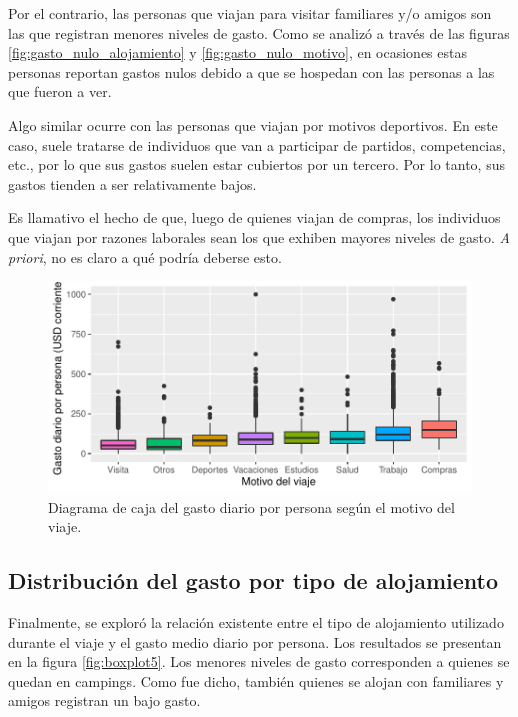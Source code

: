 \documentclass[
]{article}
\begin{document}
Por el contrario, las personas que viajan para visitar familiares y/o
amigos son las que registran menores niveles de gasto. Como se analizó a
través de las figuras \ref{fig:gasto_nulo_alojamiento} y
\ref{fig:gasto_nulo_motivo}, en ocasiones estas personas reportan gastos
nulos debido a que se hospedan con las personas a las que fueron a ver.

Algo similar ocurre con las personas que viajan por motivos deportivos.
En este caso, suele tratarse de individuos que van a participar de
partidos, competencias, etc., por lo que sus gastos suelen estar
cubiertos por un tercero. Por lo tanto, sus gastos tienden a ser
relativamente bajos.

Es llamativo el hecho de que, luego de quienes viajan de compras, los
individuos que viajan por razones laborales sean los que exhiben mayores
niveles de gasto. \emph{A priori}, no es claro a qué podría deberse
esto.

\begin{figure}[H]

{\centering \includegraphics{Informe-Proyectofinal_files/figure-latex/boxplot4-1} 

}

\caption{Diagrama de caja del gasto diario por persona según el motivo del viaje.}\label{fig:boxplot4}
\end{figure}

\hypertarget{distribuciuxf3n-del-gasto-por-tipo-de-alojamiento}{%
\subsection{Distribución del gasto por tipo de
alojamiento}\label{distribuciuxf3n-del-gasto-por-tipo-de-alojamiento}}

Finalmente, se exploró la relación existente entre el tipo de
alojamiento utilizado durante el viaje y el gasto medio diario por
persona. Los resultados se presentan en la figura \ref{fig:boxplot5}.
Los menores niveles de gasto corresponden a quienes se quedan en
campings. Como fue dicho, también quienes se alojan con familiares y
amigos registran un bajo gasto.
\end{document}
